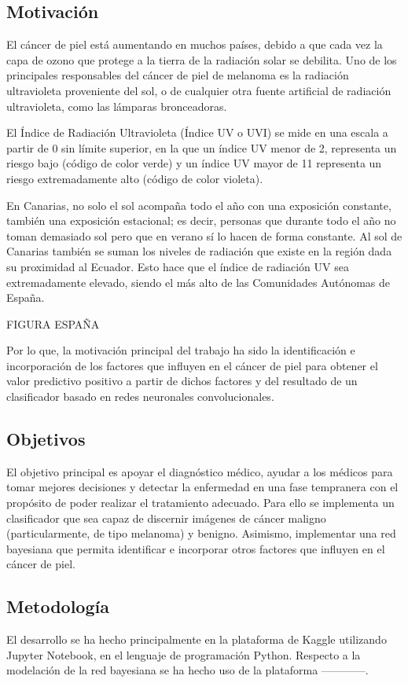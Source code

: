 \pagestyle{fancy}
\fancyhf{}

\subsection{Motivación}
El cáncer de piel está aumentando en muchos países, debido a que cada vez la capa de ozono que protege a la tierra de la radiación solar se debilita. Uno de los principales responsables del cáncer de piel de melanoma es la radiación ultravioleta proveniente del sol, o de cualquier otra fuente artificial de radiación ultravioleta, como las lámparas bronceadoras.

El Índice de Radiación Ultravioleta (Índice UV o UVI) se mide en una escala a partir de 0 sin límite superior, en la que un índice UV menor de 2, representa un riesgo bajo (código de color verde) y un índice UV mayor de 11 representa un riesgo extremadamente alto (código de color violeta).

En Canarias, no solo el sol acompaña todo el año con una exposición constante, también una exposición estacional; es decir, personas que durante todo el año no toman demasiado sol pero que en verano sí lo hacen de forma constante. Al sol de Canarias también se suman los niveles de radiación que existe en la región dada su proximidad al Ecuador. Esto hace que el índice de radiación UV sea extremadamente elevado, siendo el más alto de las Comunidades Autónomas de España.
\newpage

FIGURA ESPAÑA

\bigskip
Por lo que, la motivación principal del trabajo ha sido la identificación e incorporación de los factores que influyen en el cáncer de piel para obtener el valor predictivo positivo a partir de dichos factores y del resultado de un clasificador basado en redes neuronales convolucionales.
\newpage

\pagestyle{fancy}
\fancyhf{}
\subsection{Objetivos}
El objetivo principal es apoyar el diagnóstico médico, ayudar a los médicos para tomar mejores decisiones y detectar la enfermedad en una fase tempranera con el propósito de poder realizar el tratamiento adecuado. Para ello se implementa un clasificador que sea capaz de discernir imágenes de cáncer maligno (particularmente, de tipo melanoma) y benigno. Asimismo, implementar una red bayesiana que permita identificar e incorporar otros factores que influyen en el cáncer de piel.

\subsection{Metodología}
El desarrollo se ha hecho principalmente en la plataforma de Kaggle utilizando Jupyter Notebook, en el lenguaje de programación Python. Respecto a la modelación de la red bayesiana se ha hecho uso de la plataforma ------------.